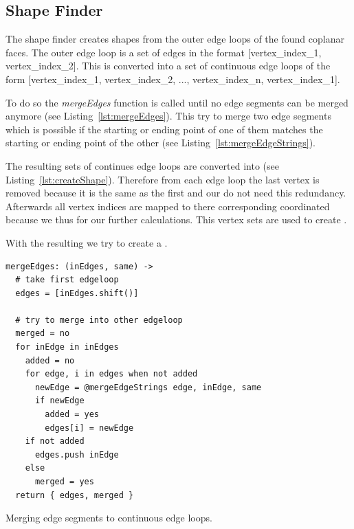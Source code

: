 \documentclass[../ClassicThesis.tex]{subfiles}
\begin{document}
\subsection{Shape Finder}\label{sub:shapesfinder}

The shape finder creates shapes from the outer edge loops of the found coplanar faces. The outer edge loop is a set of edges in the format [vertex\_index\_1, vertex\_index\_2]. This is converted into a set of continuous edge loops of the form [vertex\_index\_1, vertex\_index\_2, ..., vertex\_index\_n, vertex\_index\_1].

To do so the \emph{mergeEdges} function is called until no edge segments can be merged anymore (see Listing~\ref{lst:mergeEdges}). This try to merge two edge segments which is possible if the starting or ending point of one of them matches the starting or ending point of the other (see Listing~\ref{lst:mergeEdgeStrings}).

The resulting sets of continues edge loops are converted into  (see Listing~\ref{lst:createShape}). Therefore from each edge loop the last vertex is removed because it is the same as the first and our  do not need this redundancy. Afterwards all vertex indices are mapped to there corresponding coordinated because we thus for our further calculations. This vertex sets are used to create .

With the resulting  we try to create a . 


\begin{listing}
\begin{verbatim}
mergeEdges: (inEdges, same) ->
  # take first edgeloop
  edges = [inEdges.shift()]

  # try to merge into other edgeloop
  merged = no
  for inEdge in inEdges
    added = no
    for edge, i in edges when not added
      newEdge = @mergeEdgeStrings edge, inEdge, same
      if newEdge
        added = yes
        edges[i] = newEdge
    if not added
      edges.push inEdge
    else
      merged = yes
  return { edges, merged }
\end{verbatim}
\caption{Merging edge segments to continuous edge loops.}
\label{lst:mergeEdges}
\end{listing}
\end{document}
